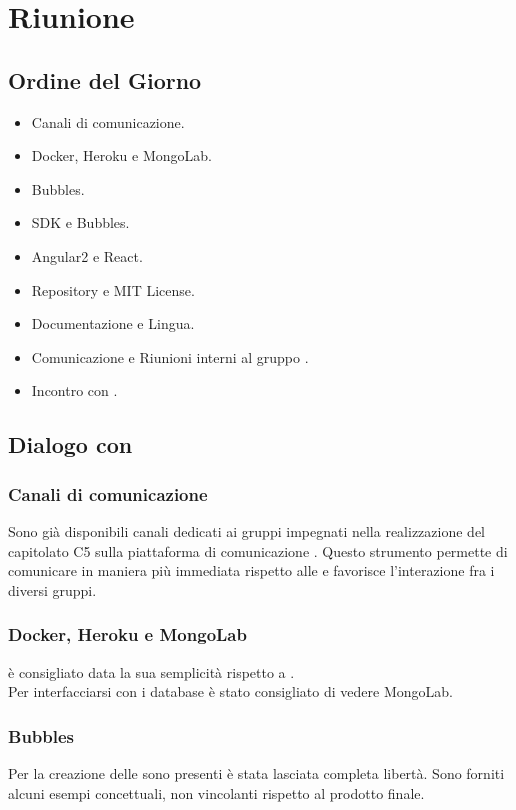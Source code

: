 \section{Riunione}
\subsection{Ordine del Giorno}
\begin{itemize}
	\item Canali di comunicazione.
	\item Docker, Heroku e MongoLab.
	\item Bubbles.
	\item SDK e Bubbles.
	\item Angular2 e React.
	\item Repository e MIT License.
	\item Documentazione e Lingua.
	\item Comunicazione e Riunioni interni al gruppo \GroupName{}.
	\item Incontro con \Proponente{}.	
\end{itemize}

\subsection{Dialogo con \Proponente}
\subsubsection{Canali di comunicazione}
Sono già disponibili canali dedicati ai gruppi impegnati nella realizzazione del capitolato C5 sulla piattaforma di comunicazione . Questo strumento permette di comunicare in maniera più immediata rispetto alle \email{} e favorisce l'interazione fra i diversi gruppi.

\subsubsection{Docker, Heroku e MongoLab}
 è consigliato data la sua semplicità rispetto a .\\ 
Per interfacciarsi con i database è stato consigliato di vedere MongoLab.

\subsubsection{Bubbles}
Per la creazione delle  sono presenti è stata lasciata completa libertà. Sono forniti alcuni esempi concettuali, non vincolanti rispetto al prodotto finale.

